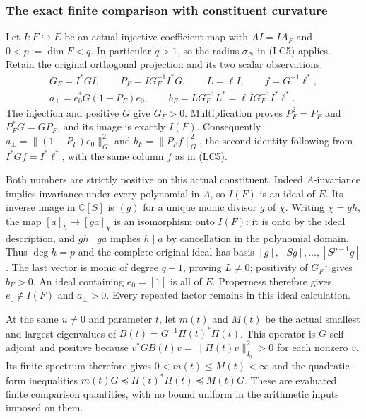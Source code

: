 \subsubsection{The exact finite comparison with constituent curvature}

Let $I:F\hookrightarrow E$ be an actual injective coefficient map
with $AI=IA_F$ and $0<p:=\dim F<q$. In particular $q>1$, so
the radius $\sigma_N$ in (LC5) applies. Retain the original
orthogonal projection and its two scalar observations:
\[
\begin{gathered}
 G_F=I^*GI,\qquad P_F=I G_F^{-1}I^*G,\qquad L=\ell I,\qquad
 f=G^{-1}\ell^*,\\
 a_\perp=e_0^*G(1-P_F)e_0,\qquad
 b_F=L G_F^{-1}L^*=\ell I G_F^{-1}I^*\ell^*.
\end{gathered}\tag{LC13}
\]
The injection and positive $G$ give $G_F>0$. Multiplication proves
$P_F^2=P_F$ and $P_F^*G=GP_F$, and its image is exactly $I(F)$.
Consequently $a_\perp=\|(1-P_F)e_0\|_G^2$ and
$b_F=\|P_Ff\|_G^2$, the second identity following from
$I^*Gf=I^*\ell^*$, with the same column $f$ as in (LC5).

Both numbers are strictly positive on this actual constituent.
Indeed $A$-invariance implies invariance under every polynomial in
$A$, so $I(F)$ is an ideal of $E$. Its inverse image in
$\mathbb C[S]$ is $(g)$ for a unique monic divisor $g$ of $\chi$.
Writing $\chi=gh$, the map $[a]_h\mapsto[ga]_\chi$ is an
isomorphism onto $I(F)$: it is onto by the ideal description, and
$gh\mid ga$ implies $h\mid a$ by cancellation in the polynomial
domain. Thus $\deg h=p$ and the complete original ideal has basis
$[g],[Sg],\ldots,[S^{p-1}g]$. The last vector is monic of degree
$q-1$, proving $L\ne0$; positivity of $G_F^{-1}$ gives $b_F>0$.
An ideal containing $e_0=[1]$ is all of $E$. Properness therefore
gives $e_0\notin I(F)$ and $a_\perp>0$. Every repeated factor
remains in this ideal calculation.

At the same $u\ne0$ and parameter $t$, let $m(t)$ and $M(t)$ be
the actual smallest and largest eigenvalues of
$B(t)=G^{-1}\Pi(t)^*\Pi(t)$. This operator is $G$-self-adjoint
and positive because $v^*GB(t)v=\|\Pi(t)v\|_{I_q}^2>0$ for
each nonzero $v$. Its finite spectrum therefore gives
$0<m(t)\le M(t)<\infty$ and the quadratic-form inequalities
$m(t)G\preceq\Pi(t)^*\Pi(t)\preceq M(t)G$.
These are evaluated finite comparison quantities, with no bound
uniform in the arithmetic inputs imposed on them.

